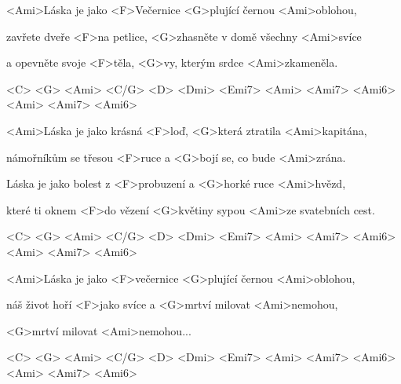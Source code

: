 

\zs
<Ami>Láska je jako <F>Večernice <G>plující černou <Ami>oblohou,

zavřete dveře <F>na petlice, <G>zhasněte v domě všechny <Ami>svíce

a opevněte svoje <F>těla, <G>vy, kterým srdce <Ami>zkameněla.

<C> <G> <Ami> <C/G> <D> <Dmi> <Emi7> <Ami> <Ami7> <Ami6> <Ami> <Ami7> <Ami6>
\ks

\zs
<Ami>Láska je jako krásná <F>loď, <G>která ztratila <Ami>kapitána,

námořníkům se třesou <F>ruce a <G>bojí se, co bude <Ami>zrána.

Láska je jako bolest z <F>probuzení a <G>horké ruce <Ami>hvězd,

které ti oknem <F>do vězení <G>květiny sypou <Ami>ze svatebních cest.

<C> <G> <Ami> <C/G> <D> <Dmi> <Emi7> <Ami> <Ami7> <Ami6> <Ami> <Ami7> <Ami6>
\ks

\zs
<Ami>Láska je jako <F>večernice <G>plující černou <Ami>oblohou,

náš život hoří <F>jako svíce a <G>mrtví milovat <Ami>nemohou,

<G>mrtví milovat <Ami>nemohou...

<C> <G> <Ami> <C/G> <D> <Dmi> <Emi7> <Ami> <Ami7> <Ami6> <Ami> <Ami7> <Ami6>
\ks

\kp
